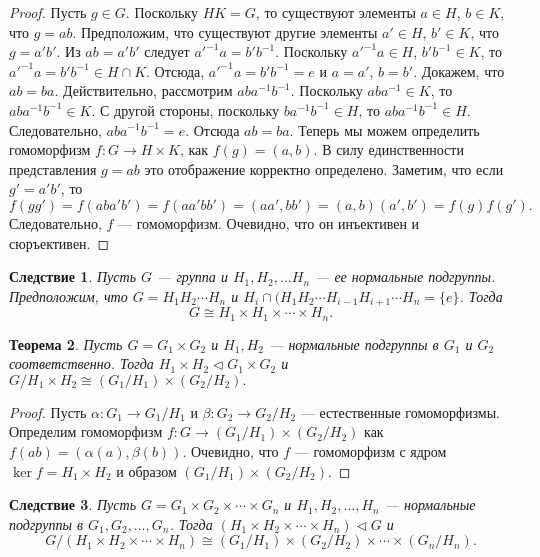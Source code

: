 \documentclass[12pt, titlepage, oneside]{amsbook}
\newtheorem{theorem}{Теорема}[chapter]
\newtheorem{corollary}[theorem]{Следствие}
\theoremstyle{definition}
\theoremstyle{remark}
\begin{document}
\begin{proof}
	Пусть $g\in G$. Поскольку $H K=G$, то существуют элементы $a\in H$, $b\in K$, что $g=ab$. Предположим, что существуют другие элементы $a'\in H$, $b'\in K$, что $g=a'b'$. Из $ab=a'b'$ следует $a'^{-1}a=b'b^{-1}$. Поскольку $a'^{-1}a\in H$, $b'b^{-1}\in K$, то $a'^{-1}a=b'b^{-1}\in H\cap K$. Отсюда, $a'^{-1}a=b'b^{-1}=e$ и $a=a'$, $b=b'$. Докажем, что $ab=ba$. Действительно, рассмотрим $aba^{-1}b^{-1}$. Поскольку $aba^{-1}\in K$, то $aba^{-1}b^{-1}\in K$. С другой стороны, поскольку $ba^{-1}b^{-1}\in H$, то $aba^{-1}b^{-1}\in H$. Следовательно, $aba^{-1}b^{-1}=e$. Отсюда $ab=ba$. Теперь мы можем определить гомоморфизм $f\colon G\rightarrow H\times K$, как $f(g)=(a,b)$. В силу единственности представления $g=ab$ это отображение корректно определено. Заметим, что если $g'=a'b'$, то $$f(gg')=f(aba'b')=f(aa'bb')=(aa',bb')=(a,b)(a',b')=f(g)f(g').$$ Следовательно, $f$ --- гомоморфизм. Очевидно, что он инъективен и сюръективен.
\end{proof}

\begin{corollary}
	\label{Proizv2}
	Пусть $G$ --- группа и $H_1, H_2,\ldots H_n$ --- ее нормальные подгруппы. Предположим, что $G=H_1H_2\cdots H_n$ и $H_i\cap(H_1H_2\cdots H_{i-1} H_{i+1}\cdots H_n=\{e\}$. Тогда $$G\cong H_1\times H_1\times\cdots\times H_n.$$
\end{corollary}

\begin{theorem}
	\label{Proizv3} Пусть $G=G_1\times G_2$ и $H_1,H_2$ --- нормальные подгруппы в $G_1$ и $G_2$ соответственно. Тогда $H_1\times H_2\triangleleft G_1\times G_2$ и $G/H_1\times H_2\cong(G_1/H_1)\times(G_2/H_2).$
\end{theorem}

\begin{proof}
	Пусть $\alpha\colon G_1\rightarrow G_1/H_1$ и $\beta\colon G_2\rightarrow G_2/H_2$ --- естественные гомоморфизмы. Определим гомоморфизм $f\colon G\rightarrow (G_1/H_1)\times(G_2/H_2)$ как $f(ab)=(\alpha(a),\beta(b))$. Очевидно, что $f$ --- гомоморфизм с ядром $\ker f=H_1\times H_2$ и образом $(G_1/H_1)\times(G_2/H_2).$
\end{proof}

\begin{corollary}
	\label{Proizv4}
	Пусть $G=G_1\times G_2\times\cdots\times G_n$ и $H_1,H_2,\ldots, H_n$ --- нормальные подгруппы в $G_1,G_2,\ldots,G_n$. Тогда $(H_1\times H_2\times\cdots\times H_n)\triangleleft G$ и $$G/(H_1\times H_2\times\cdots\times H_n)\cong(G_1/H_1)\times(G_2/H_2)\times\cdots\times (G_n/H_n).$$
\end{corollary}
\end{document}
